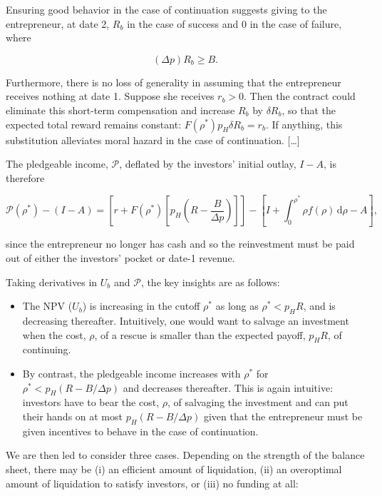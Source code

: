 \documentclass[11pt,a4paper]{article}
\providecommand{\tightlist}{\setlength{\itemsep}{0pt}\setlength{\parskip}{0pt}}
\begin{document}
Ensuring good behavior in the case of continuation suggests giving to the entrepreneur, at date 2,
\(R_b\) in the case of success and 0 in the case of failure, where

\[(\Delta p)R_b \geqslant B.\]

Furthermore, there is no loss of generality in assuming that the entrepreneur receives nothing at
date 1. Suppose she receives \(r_b > 0\). Then the contract could eliminate this short-term
compensation and increase \(R_b\) by \(\delta R_b\), so that the expected total reward remains
constant: \(F(\rho^*)p_H\delta R_b = r_b\). If anything, this substitution alleviates moral hazard
in the case of continuation. {[}\ldots{]}

The pledgeable income, \(\mathcal{P}\), deflated by the investors' initial outlay, \(I - A\), is
therefore

\[\mathcal{P}(\rho^*) - (I - A) = \left[r + F(\rho^*)\left[p_H\left(R - \frac{B}{\Delta p}\right)\right]\right] - \left[I + \int_0^{\rho^*}\rho f(\rho)\,\mathrm{d}\rho - A\right],\]

since the entrepreneur no longer has cash and so the reinvestment must be paid out of either the
investors' pocket or date-1 revenue.

Taking derivatives in \(U_b\) and \(\mathcal{P}\), the key insights are as follows:

\begin{itemize}
\tightlist
\item
  The NPV (\(U_b\)) is increasing in the cutoff \(\rho^*\) as long as \(\rho^* < p_HR\), and is
  decreasing thereafter. Intuitively, one would want to salvage an investment when the cost,
  \(\rho\), of a rescue is smaller than the expected payoff, \(p_HR\), of continuing.
\item
  By contrast, the pledgeable income increases with \(\rho^*\) for \(\rho^* < p_H(R - B/\Delta p)\)
  and decreases thereafter. This is again intuitive: investors have to bear the cost, \(\rho\), of
  salvaging the investment and can put their hands on at most \(p_H(R - B/\Delta p)\) given that the
  entrepreneur must be given incentives to behave in the case of continuation.
\end{itemize}

We are then led to consider three cases. Depending on the strength of the balance sheet, there may
be (i) an efficient amount of liquidation, (ii) an overoptimal amount of liquidation to satisfy
investors, or (iii) no funding at all:
\end{document}
